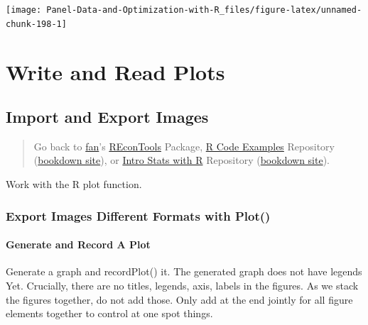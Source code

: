 \documentclass[
]{book}
\begin{document}
\begin{center}\texttt{[image: Panel-Data-and-Optimization-with-R\_files/figure-latex/unnamed-chunk-198-1]} \end{center}

\hypertarget{write-and-read-plots}{%
\section{Write and Read Plots}\label{write-and-read-plots}}

\hypertarget{import-and-export-images}{%
\subsection{Import and Export Images}\label{import-and-export-images}}

\begin{quote}
Go back to \href{http://fanwangecon.github.io/}{fan}'s \href{https://fanwangecon.github.io/REconTools/}{REconTools} Package, \href{https://fanwangecon.github.io/R4Econ/}{R Code Examples} Repository (\href{https://fanwangecon.github.io/R4Econ/bookdown}{bookdown site}), or \href{https://fanwangecon.github.io/Stat4Econ/}{Intro Stats with R} Repository (\href{https://fanwangecon.github.io/Stat4Econ/bookdown}{bookdown site}).
\end{quote}

Work with the R plot function.

\hypertarget{export-images-different-formats-with-plot}{%
\subsubsection{Export Images Different Formats with Plot()}\label{export-images-different-formats-with-plot}}

\hypertarget{generate-and-record-a-plot}{%
\paragraph{Generate and Record A Plot}\label{generate-and-record-a-plot}}

Generate a graph and recordPlot() it. The generated graph does not have legends Yet. Crucially, there are no titles, legends, axis, labels in the figures. As we stack the figures together, do not add those. Only add at the end jointly for all figure elements together to control at one spot things.
\end{document}
